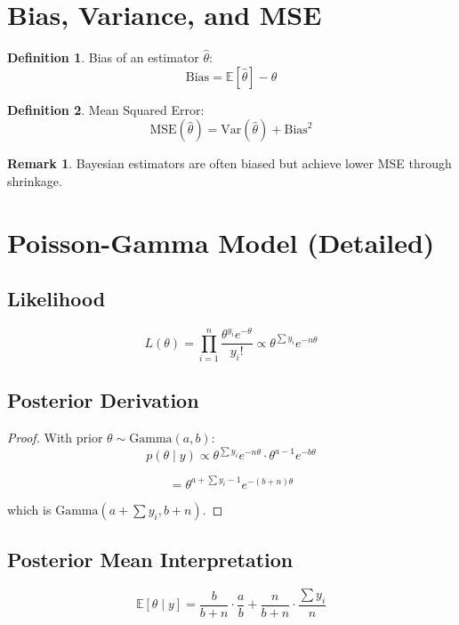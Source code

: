 \documentclass[12pt,oneside]{book}
\numberwithin{equation}{section}
\theoremstyle{definition}
\newtheorem{definition}{Definition}[section]
\newtheorem{remark}{Remark}[section]
\theoremstyle{plain}
\theoremstyle{remark}
\newcommand{\E}{\mathbb{E}}
\newcommand{\Var}{\mathrm{Var}}
\newcommand{\Gam}{\mathrm{Gamma}}
\begin{document}
\section{Bias, Variance, and MSE}

\begin{definition}
Bias of an estimator $\hat{\theta}$:
$$
\text{Bias} = \E[\hat{\theta}] - \theta
$$
\end{definition}

\begin{definition}
Mean Squared Error:
$$
\text{MSE}(\hat{\theta}) = \Var(\hat{\theta}) + \text{Bias}^2
$$
\end{definition}

\begin{remark}
Bayesian estimators are often biased but achieve lower MSE through shrinkage.
\end{remark}

\section{Poisson-Gamma Model (Detailed)}

\subsection{Likelihood}

$$
L(\theta) = \prod_{i=1}^n \frac{\theta^{y_i} e^{-\theta}}{y_i!}
\propto \theta^{\sum y_i} e^{-n\theta}
$$

\subsection{Posterior Derivation}

\begin{proof}
With prior $\theta \sim \Gam(a,b)$:
$$
p(\theta \mid y) \propto \theta^{\sum y_i} e^{-n\theta} \cdot \theta^{a-1} e^{-b\theta}
$$

$$
= \theta^{a+\sum y_i -1} e^{-(b+n)\theta}
$$

which is $\Gam(a+\sum y_i, b+n)$.
\end{proof}

\subsection{Posterior Mean Interpretation}

$$
\E[\theta \mid y] =
\frac{b}{b+n} \cdot \frac{a}{b}
+
\frac{n}{b+n} \cdot \frac{\sum y_i}{n}
$$
\end{document}
